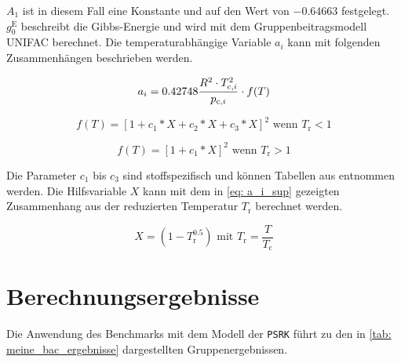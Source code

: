 \documentclass[../thesis.tex]{subfiles}
\begin{document}
$ A_1$ ist in diesem Fall eine Konstante und auf den Wert von $-0$.$64663$ festgelegt. $ g^{\mathrm{E}}_0 $ beschreibt die Gibbs-Energie und wird mit dem Gruppenbeitragsmodell UNIFAC berechnet. Die temperaturabhängige Variable $a_i$ kann mit folgenden Zusammenhängen beschrieben werden.

\begin{equation}
	a_i = 0\text{.}42748 \dfrac{R^2 \cdot T_{\mathrm{c},i}^2}{p_{\mathrm{c},i}} \cdot f(T) \\
\end{equation}

\begin{equation}
	f(T) = \left[1 + c_1 * X + c_2 * X + c_3 *X \right]^2 \text{ wenn } T_\mathrm{r} < 1
\end{equation} 

\begin{equation}
	f(T) = \left[1 + c_1 * X \right]^2 \text{ wenn } T_\mathrm{r} > 1
\end{equation}

Die Parameter $ c_1 $ bis $ c_3 $ sind stoffspezifisch und können Tabellen aus \cite{horstmann2005psrk} entnommen werden. Die Hilfsvariable $ X$ kann mit dem in \autoref{eq: a_i_sup} gezeigten Zusammenhang aus der reduzierten Temperatur $T_\mathrm{r}$ berechnet werden.

\begin{equation}
	X = \left( 1 - T_\mathrm{r}^{0\text{.}5} \right) \text{ mit } T_\mathrm{r} = \dfrac{T}{T_\mathrm{c}}
	\label{eq: a_i_sup}
\end{equation} 

\section{Berechnungsergebnisse}

Die Anwendung des Benchmarks mit dem Modell der \texttt{PSRK} führt zu den in \autoref{tab: meine_bac_ergebnisse} dargestellten Gruppenergebnissen.
\end{document}
